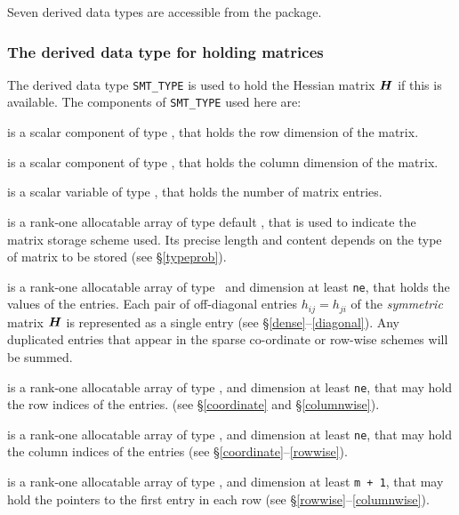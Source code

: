 \documentclass{galahad}
\begin{document}




\galtypes
Seven derived data types are accessible from the package.


\subsubsection{The derived data type for holding matrices}\label{typesmt}
The derived data type {\tt SMT\_TYPE} is used to hold the Hessian matrix ${\bm{H}}$
if this is available. The components of {\tt SMT\_TYPE} used here are:

\begin{description}

 is a scalar component of type \integer,
that holds the row dimension of the matrix.

 is a scalar component of type \integer,
that holds the column dimension of the matrix.

 is a scalar variable of type \integer, that
holds the number of matrix entries.

 is a rank-one allocatable array of type default \character, that
is used to indicate the matrix storage scheme used. Its precise length and
content depends on the type of matrix to be stored (see \S\ref{typeprob}).

 is a rank-one allocatable array of type \realdp\,
and dimension at least {\tt ne}, that holds the values of the entries.
Each pair of off-diagonal entries $h_{ij} = h_{ji}$ of the {\em symmetric}
matrix ${\bm{H}}$ is represented as a single entry
(see \S\ref{dense}--\ref{diagonal}).
Any duplicated entries that appear in the sparse
co-ordinate or row-wise schemes will be summed.

 is a rank-one allocatable array of type \integer,
and dimension at least {\tt ne}, that may hold the row indices of the entries.
(see \S\ref{coordinate} and \S\ref{columnwise}).

 is a rank-one allocatable array of type \integer,
and dimension at least {\tt ne}, that may hold the column indices of the entries
(see \S\ref{coordinate}--\ref{rowwise}).

 is a rank-one allocatable array of type \integer,
and dimension at least {\tt m + 1}, that may hold the pointers to
the first entry in each row (see \S\ref{rowwise}--\ref{columnwise}).

\end{description}
\end{document}
